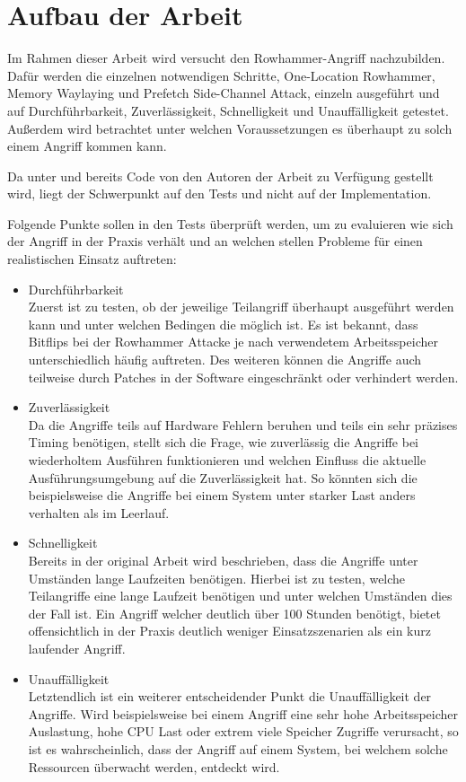 \documentclass[conference]{IEEEtran}
\begin{document}
\section{Aufbau der Arbeit}
Im Rahmen dieser Arbeit wird versucht den Rowhammer-Angriff nachzubilden. Dafür werden die einzelnen notwendigen Schritte, One-Location Rowhammer, Memory Waylaying und Prefetch Side-Channel Attack, einzeln ausgeführt und auf Durchführbarkeit, Zuverlässigkeit, Schnelligkeit und Unauffälligkeit getestet. Außerdem wird betrachtet unter welchen Voraussetzungen es überhaupt zu solch einem Angriff kommen kann.

Da unter \cite{git-rowhammer} und \cite{git-prefetch} bereits Code von den Autoren der Arbeit \cite{DBLP:journals/corr/abs-1710-00551} zu Verfügung gestellt wird, liegt der Schwerpunkt auf den Tests und nicht auf der Implementation.

Folgende Punkte sollen in den Tests überprüft werden, um zu evaluieren wie sich der Angriff in der Praxis verhält und an welchen stellen Probleme für einen realistischen Einsatz auftreten:

\begin{itemize}
	\item Durchführbarkeit ~\\
	Zuerst ist zu testen, ob der jeweilige Teilangriff überhaupt ausgeführt werden kann und unter welchen Bedingen die möglich ist. Es ist bekannt, dass Bitflips bei der Rowhammer Attacke je nach verwendetem Arbeitsspeicher unterschiedlich häufig auftreten. Des weiteren können die Angriffe auch teilweise durch Patches in der Software eingeschränkt oder verhindert werden.
	
	\item Zuverlässigkeit ~\\
	Da die Angriffe teils auf Hardware Fehlern beruhen und teils ein sehr präzises Timing benötigen, stellt sich die Frage, wie zuverlässig die Angriffe bei wiederholtem Ausführen funktionieren und welchen Einfluss die aktuelle Ausführungsumgebung auf die Zuverlässigkeit hat. So könnten sich die beispielsweise die Angriffe bei einem System unter starker Last anders verhalten als im Leerlauf.
	
	\item Schnelligkeit ~\\
	Bereits in der original Arbeit wird beschrieben, dass die Angriffe unter Umständen lange Laufzeiten benötigen. Hierbei ist zu testen, welche Teilangriffe eine lange Laufzeit benötigen und unter welchen Umständen dies der Fall ist. Ein Angriff welcher deutlich über 100 Stunden benötigt, bietet offensichtlich in der Praxis deutlich weniger Einsatzszenarien als ein kurz laufender Angriff.
	
	\item Unauffälligkeit ~\\
	Letztendlich ist ein weiterer entscheidender Punkt die Unauffälligkeit der Angriffe. Wird beispielsweise bei einem Angriff eine sehr hohe Arbeitsspeicher Auslastung, hohe CPU Last oder extrem viele Speicher Zugriffe verursacht, so ist es wahrscheinlich, dass der Angriff auf einem System, bei welchem solche Ressourcen überwacht werden, entdeckt wird.
	
\end{itemize}
\end{document}
